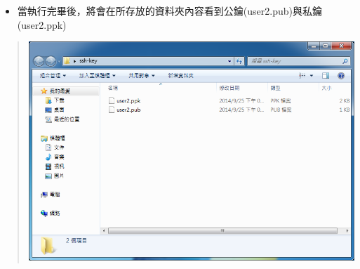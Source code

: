 \documentclass[letterpaper,10pt,english]{sphinxmanual}
\begin{document}
\begin{itemize}
\item {} 
當執行完畢後，將會在所存放的資料夾內容看到公鑰(user2.pub)與私鑰(user2.ppk)

\end{itemize}
\begin{quote}

\includegraphics{puttygen-006.png}
\end{quote}
\end{document}
